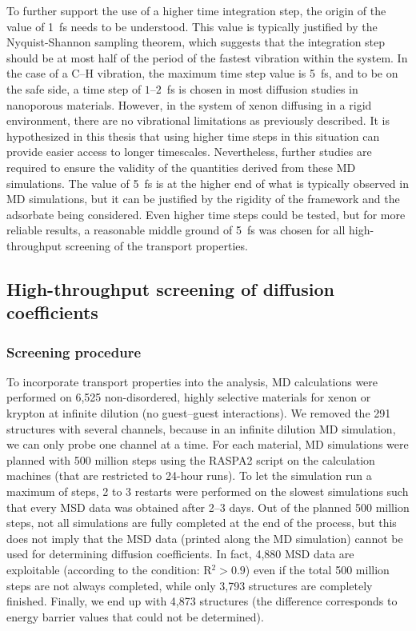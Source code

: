 \documentclass[main]{subfiles}
\begin{document}
To further support the use of a higher time integration step, the origin of the value of \SI{1}{\fs} needs to be understood. This value is typically justified by the Nyquist-Shannon sampling theorem, which suggests that the integration step should be at most half of the period of the fastest vibration within the system. In the case of a C--H vibration, the maximum time step value is \SI{5}{\fs}, and to be on the safe side, a time step of $1$--$2$~\si{\fs} is chosen in most diffusion studies in nanoporous materials.\autocite{Bukowski_2021} However, in the system of xenon diffusing in a rigid environment, there are no vibrational limitations as previously described. It is hypothesized in this thesis that using higher time steps in this situation can provide easier access to longer timescales. Nevertheless, further studies are required to ensure the validity of the quantities derived from these MD simulations. The value of \SI{5}{\fs} is at the higher end of what is typically observed in MD simulations, but it can be justified by the rigidity of the framework and the adsorbate being considered. Even higher time steps could be tested, but for more reliable results, a reasonable middle ground of \SI{5}{\fs} was chosen for all high-throughput screening of the transport properties.

\subsection{High-throughput screening of diffusion coefficients}

\subsubsection{Screening procedure}

To incorporate transport properties into the analysis, MD calculations were performed on 6,525 non-disordered, highly selective materials for xenon or krypton at infinite dilution (no guest--guest interactions). We removed the 291 structures with several channels, because in an infinite dilution MD simulation, we can only probe one channel at a time. For each material, MD simulations were planned with 500 million steps using the RASPA2 script on the calculation machines (that are restricted to 24-hour runs). To let the simulation run a maximum of steps, 2 to 3 restarts were performed on the slowest simulations such that every MSD data was obtained after 2--3 days. Out of the planned 500 million steps, not all simulations are fully completed at the end of the process, but this does not imply that the MSD data (printed along the MD simulation) cannot be used for determining diffusion coefficients. In fact, 4,880 MSD data are exploitable (according to the condition: R$^2>0.9$) even if the total 500 million steps are not always completed, while only 3,793 structures are completely finished. Finally, we end up with 4,873 structures (the difference corresponds to energy barrier values that could not be determined).
\end{document}
